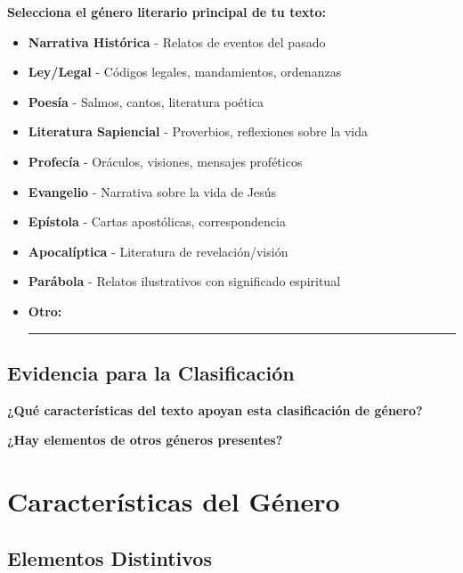 \documentclass[11pt,a4paper]{article}
\begin{document}
\begin{genrebox}
\textbf{Selecciona el género literario principal de tu texto:}
\end{genrebox}

\begin{itemize}[leftmargin=1cm]
    \item[$\square$] \textbf{Narrativa Histórica} - Relatos de eventos del pasado
    \item[$\square$] \textbf{Ley/Legal} - Códigos legales, mandamientos, ordenanzas
    \item[$\square$] \textbf{Poesía} - Salmos, cantos, literatura poética
    \item[$\square$] \textbf{Literatura Sapiencial} - Proverbios, reflexiones sobre la vida
    \item[$\square$] \textbf{Profecía} - Oráculos, visiones, mensajes proféticos
    \item[$\square$] \textbf{Evangelio} - Narrativa sobre la vida de Jesús
    \item[$\square$] \textbf{Epístola} - Cartas apostólicas, correspondencia
    \item[$\square$] \textbf{Apocalíptica} - Literatura de revelación/visión
    \item[$\square$] \textbf{Parábola} - Relatos ilustrativos con significado espiritual
    \item[$\square$] \textbf{Otro:} \rule{8cm}{0.4pt}
\end{itemize}

\subsection{Evidencia para la Clasificación}

\textbf{¿Qué características del texto apoyan esta clasificación de género?}
\vspace{3cm}

\textbf{¿Hay elementos de otros géneros presentes?}
\vspace{2cm}

\section{Características del Género}

\subsection{Elementos Distintivos}
\end{document}
